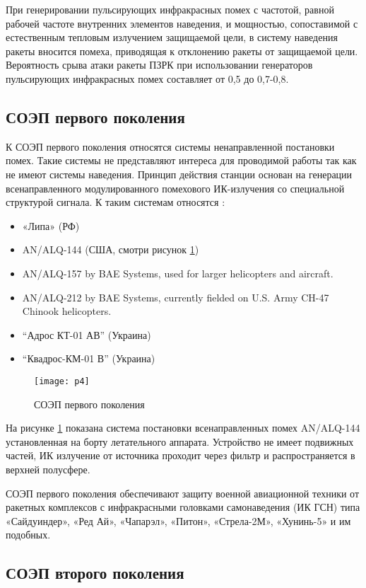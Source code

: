 При генерировании пульсирующих инфракрасных помех с частотой, равной рабочей частоте внутренних элементов наведения, и мощностью, сопоставимой с естественным тепловым излучением защищаемой цели, в систему наведения ракеты вносится помеха, приводящая к отклонению ракеты от защищаемой цели. Вероятность срыва атаки ракеты ПЗРК при использовании генераторов пульсирующих инфракрасных помех составляет от 0,5 до 0,7-0,8.

\subsection{СОЭП первого поколения}	

К СОЭП первого поколения относятся системы ненаправленной постановки помех. Такие системы не представляют интереса для проводимой работы так как не имеют системы наведения. Принцип действия станции основан на генерации всенаправленного модулированного помехового ИК-излучения со специальной структурой сигнала. К таким системам относятся \cite[]{SOEP_LIPA}:

\begin{itemize}
	\item «Липа» (РФ)	
	\item AN/ALQ-144 (США, смотри рисунок \ref{fig:alq})	
	\item AN/ALQ-157 by BAE Systems, used for larger helicopters and aircraft.
	\item AN/ALQ-212 by BAE Systems, currently fielded on U.S. Army CH-47 Chinook helicopters.
	\item “Адрос КТ-01 АВ” (Украина)
	\item “Квадрос-КМ-01 В” (Украина) 		
\end{itemize}

\begin{figure}[ht]
	\texttt{[image: p4]} 
	\caption{СОЭП первого поколения}
	\label{fig:alq}
\end{figure}
На рисунке \ref{fig:alq} показана система постановки всенаправленных помех AN/ALQ-144 установленная на борту летательного аппарата. Устройство не имеет подвижных частей, ИК излучение от источника проходит через фильтр и распространяется в верхней полусфере.

СОЭП первого поколения обеспечивают защиту военной авиационной техники от ракетных комплексов с инфракрасными головками самонаведения (ИК ГСН) типа «Сайдуиндер», «Ред Ай», «Чапарэл», «Питон», «Стрела-2М», «Хунинь-5» и им подобных. 

\subsection{СОЭП второго поколения}	

